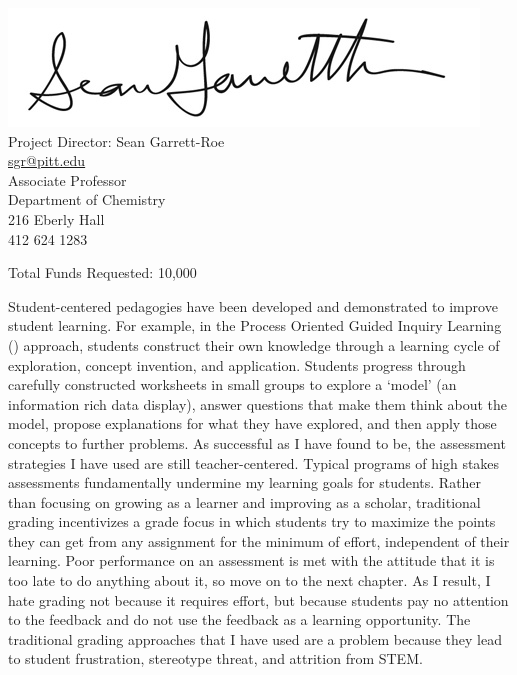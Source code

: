 \documentclass[10pt,letterpaper]{article}
\begin{document}
\newpage
\pagestyle{empty}
\vspace*{\fill}
\begin{center}

\vspace{2\baselineskip}

\includegraphics[scale=1.2]{sgr_signature_2011_v2.jpg}\\
Project Director: Sean Garrett-Roe \\
\href{mailto:sgr@pitt.edu}{sgr@pitt.edu}\\
Associate Professor\\
Department of Chemistry\\
216 Eberly Hall\\
412 624 1283

\vspace{2\baselineskip}
 
Total Funds Requested: 10,000 

\end{center}
\vspace{\fill}


\newpage
{}
\pagestyle{fancy}

Student-centered pedagogies have been developed and demonstrated to improve student learning. 
For example, in the Process Oriented Guided Inquiry Learning (\pogil) approach, students construct their own knowledge
through a learning cycle of exploration, concept invention, and application.
Students progress through carefully constructed worksheets in small groups to explore a `model' (an information rich data display), answer questions that make them think about the model, propose explanations for what they have explored, and then apply those concepts to further problems.
% 
As successful as I have found \pogil to be, the assessment strategies I have used are still teacher-centered. Typical programs of high stakes assessments fundamentally undermine my learning goals for students. Rather than focusing on growing as a learner and improving as a scholar, traditional grading incentivizes a grade focus in which students try to maximize the points they can get from any assignment for the minimum of effort, independent of their learning. Poor performance on an assessment is met with the attitude that it is too late to do anything about it, so move on to the next chapter. As I result, I hate grading not because it requires effort, but because students pay no attention to the feedback and do not use the feedback as a learning opportunity. 
The traditional grading approaches that I have used are a problem because they lead to student frustration, stereotype threat, and attrition from STEM. 
\end{document}
